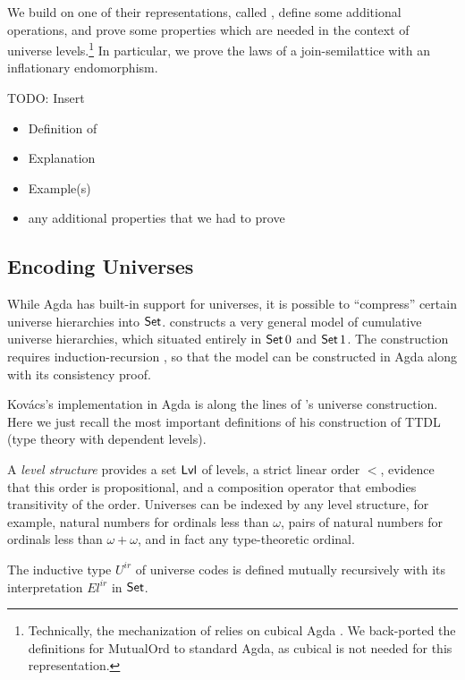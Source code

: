 \documentclass[manuscript,screen,review,anonymous]{acmart}
\begin{document}
We build on one of their representations, called {\AMutualOrd}, define
some additional operations, and prove some properties which are needed
in the context of universe levels.\footnote{Technically, the
  mechanization of \citet{DBLP:conf/cpp/ForsbergXG20} relies on
  cubical Agda \cite{XXX}. We back-ported the definitions for
  MutualOrd to standard Agda, as cubical is not needed for this representation.}
In particular, we prove the laws of a join-semilattice with an
inflationary endomorphism.

TODO: Insert
\begin{itemize}
\item Definition of \AMutualOrd
\item Explanation
\item Example(s)
\item any additional properties that we had to prove
\end{itemize}

\subsection{Encoding Universes}
\label{sec:encoding-universes}

While Agda has built-in support for universes, it is possible to
``compress'' certain universe hierarchies into
$\ASet$. \citet{DBLP:conf/csl/Kovacs22} constructs a very general model
of cumulative universe hierarchies, which situated entirely in $\ASeti{0}$
and $\ASeti{1}$. The construction requires induction-recursion
\cite{DBLP:conf/tlca/DybjerS99}, so that the model can be constructed
in Agda along with its consistency proof.

Kov\'{a}cs's implementation in Agda is along the lines of
\citet{mcbride15:_datat_datat}'s universe construction. Here we just
recall the most important definitions of his construction of TTDL
(type theory with dependent levels).

A \emph{level structure} provides a set $\ALvl$ of levels, a strict
linear order $<$, evidence that this order is propositional, and a
composition operator that embodies transitivity of the
order. Universes can be indexed by any level structure, for example,
natural numbers for ordinals less than $\omega$, pairs of natural
numbers for ordinals less than $\omega+\omega$, and in fact any
type-theoretic ordinal.

\ULvlStruct

The inductive type $U^{ir}$ of universe codes is defined mutually
recursively with its interpretation $El^{ir}$ in $\ASet$.
\end{document}
